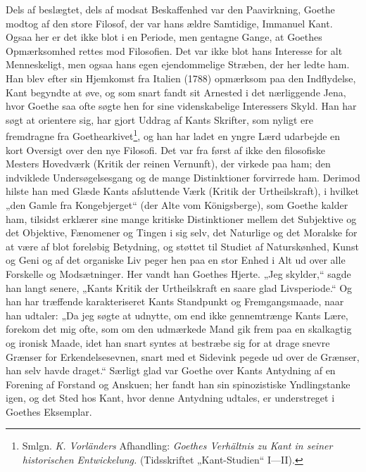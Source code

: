 \documentclass[12pt,a4paper,openany]{book}
\newcommand{\opage}[1]{\marginnote{\footnotesize\textit{[#1]}}}
\begin{document}
Dels af beslægtet, dels af modsat Beskaffenhed var den
Paavirkning, Goethe modtog af den store Filosof, der var hans
ældre Samtidige, Immanuel Kant. Ogsaa her er det ikke blot i
en Periode, men gentagne Gange, at Goethes Opmærksomhed
rettes mod Filosofien. Det var ikke blot hans Interesse for alt
Menneskeligt, men ogsaa hans egen ejendommelige Stræben,
der her ledte ham. Han blev efter sin Hjemkomst fra Italien
(1788) opmærksom paa den Indflydelse, Kant begyndte at øve,
og som snart fandt sit Arnested i det nærliggende Jena, hvor
Goethe saa ofte søgte hen for sine videnskabelige Interessers
Skyld. Han har søgt at orientere sig, har gjort Uddrag af
Kants Skrifter, som nyligt ere fremdragne fra Goethearkivet\footnote[1]{Smlgn. \textit{K. Vorländers} Afhandling: \textit{Goethes Verhältnis zu Kant in seiner historischen Entwickelung.} (Tidsskriftet „Kant-Studien“ I---II).},
og han har ladet en yngre Lærd udarbejde en kort Oversigt over
den nye Filosofi. Det var fra først af ikke den filosofiske
Mesters Hovedværk (Kritik der reinen Vernunft), der virkede
\setcounter{footnote}{0}%
\opage{165}paa ham; den indviklede Undersøgelsesgang og de mange Distinktioner
forvirrede ham. Derimod hilste han med Glæde
Kants afsluttende Værk (Kritik der Urtheilskraft), i hvilket „den
Gamle fra Kongebjerget“ (der Alte vom Königsberge), som
Goethe kalder ham, tilsidst erklærer sine mange kritiske Distinktioner
mellem det Subjektive og det Objektive, Fænomener
og Tingen i sig selv, det Naturlige og det Moralske for at være
af blot foreløbig Betydning, og støttet til Studiet af Naturskønhed,
Kunst og Geni og af det organiske Liv peger hen paa en
stor Enhed i Alt ud over alle Forskelle og Modsætninger. Her
vandt han Goethes Hjerte. „Jeg skylder,“ sagde han langt
senere, „Kants Kritik der Urtheilskraft en saare glad Livsperiode.“
Og han har træffende karakteriseret Kants Standpunkt
og Fremgangsmaade, naar han udtaler: „Da jeg søgte at
udnytte, om end ikke gennemtrænge Kants Lære, forekom det
mig ofte, som om den udmærkede Mand gik frem paa en skalkagtig
og ironisk Maade, idet han snart syntes at bestræbe sig
for at drage snevre Grænser for Erkendelsesevnen, snart med
et Sidevink pegede ud over de Grænser, han selv havde draget.“
Særligt glad var Goethe over Kants Antydning af en
Forening af Forstand og Anskuen; her fandt han sin spinozistiske
Yndlingstanke igen, og det Sted hos Kant, hvor denne Antydning
udtales, er understreget i Goethes Eksemplar.
\end{document}
